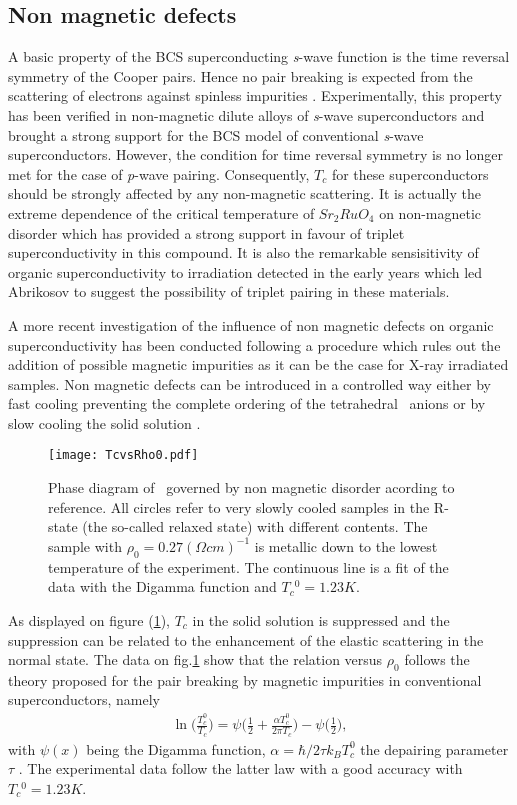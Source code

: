 \documentclass[11pt]{article} %
\begin{document}
\subsection{Non magnetic defects}
\label{Non magnetic defects}
A basic property of the BCS superconducting \textit{s}-wave function is the time reversal symmetry of the Cooper pairs.  
Hence no pair breaking is
expected from the scattering of electrons against spinless impurities \cite{Anderson59}. Experimentally,
this property has been verified in non-magnetic dilute alloys of \textit{s}-wave superconductors and
brought a strong support for the BCS model of conventional \textit{s}-wave superconductors. However,
the condition for time reversal symmetry is no longer met for the case of \textit{p}-wave pairing. Consequently,   $T_c$ for these superconductors should be strongly affected by any non-magnetic scattering. It is actually the  extreme dependence of the critical temperature of
$Sr_{2}RuO_4$
\cite{Mackenzie03} on non-magnetic disorder which has provided a  strong support in favour of triplet
superconductivity in this compound. 
It is also the  remarkable sensisitivity  of organic
superconductivity to irradiation detected in the early years\cite{Bouffard82,Choi82} which led Abrikosov to suggest the possibility of
triplet pairing in these materials\cite{Abrikosov83}.

A more recent investigation of the influence of non magnetic defects on organic superconductivity has been conducted following a procedure which rules out the addition of possible magnetic impurities as it can be the case for X-ray irradiated samples.
Non magnetic defects can be introduced in a controlled way either by fast cooling preventing the complete ordering of the tetrahedral \cl\, anions or by slow cooling the solid solution \tmx.

\begin{figure}[h]	
\centerline{ \texttt{[image: TcvsRho0.pdf]}}
\caption{Phase diagram of \tmx \, governed by  non magnetic disorder acording to reference\cite{Joo05}. All  circles  refer to  very slowly cooled samples in the
R-state (the so-called relaxed state) with different \R contents. The  sample with $\rho_0=0.27(\Omega cm)^{-1}$ is metallic down to the lowest temperature of the experiment. The continuous line  is a fit of the data with the Digamma function and $T_{c}{^0}=1.23K$.}
\label{TcvsRho0.pdf} 
\end{figure}
As displayed on figure (\ref{TcvsRho0.pdf}), $T_c$ in the solid solution is  suppressed  and the suppression can be related to the enhancement of the elastic scattering in the normal state. The data on fig.\ref{TcvsRho0.pdf} show that the relation \tc versus $\rho_0$ follows  the theory proposed for the pair breaking by magnetic impurities in conventional superconductors, namely
\begin{eqnarray}
\ln\Big(\frac{T_{c}^0}{T_{c}}\Big)=\psi\Big(\frac{1}{2}+\frac{\alpha T_{c}^0}{2\pi T_{c}}\Big)-\psi\Big(\frac{1}{2}\Big),
\end{eqnarray}
with $\psi(x)$ being the Digamma function, $\alpha = \hbar /2 \tau k_{B}T_{c}^0$ the depairing parameter $\tau$
.
The experimental data follow the latter law with a good accuracy with 
$T_{c}{^0}=1.23K$.
\end{document}
